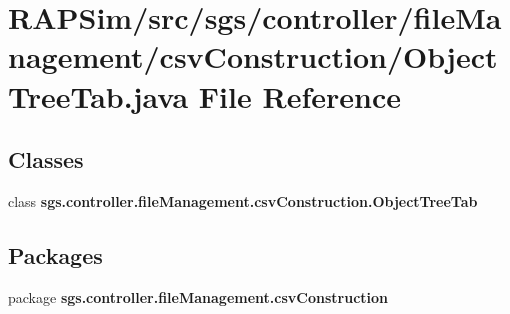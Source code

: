\section{R\-A\-P\-Sim/src/sgs/controller/file\-Management/csv\-Construction/\-Object\-Tree\-Tab.java File Reference}
\label{_object_tree_tab_8java}
\subsection*{Classes}
\begin{DoxyCompactItemize}
\item 
class {\bf sgs.\-controller.\-file\-Management.\-csv\-Construction.\-Object\-Tree\-Tab}
\end{DoxyCompactItemize}
\subsection*{Packages}
\begin{DoxyCompactItemize}
\item 
package {\bf sgs.\-controller.\-file\-Management.\-csv\-Construction}
\end{DoxyCompactItemize}
